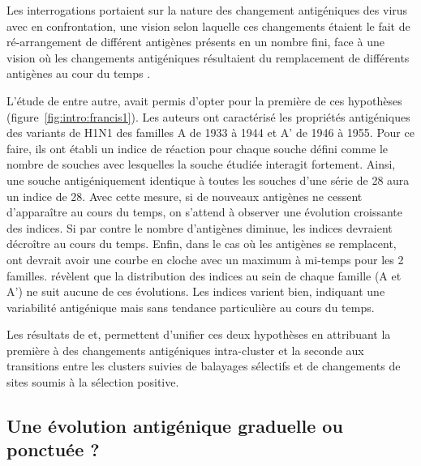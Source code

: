 Les interrogations portaient sur la nature des changement antigéniques
des virus avec en confrontation, une vision selon laquelle ces
changements étaient le fait de ré-arrangement de différent antigènes
présents en un nombre fini, face à une vision où les changements
antigéniques résultaient du remplacement de différents antigènes au
cour du temps \citep{Francis1960}.

L'étude de \citet{Jensen1957} entre autre, avait permis d'opter pour
la première de ces hypothèses (figure~\ref{fig:intro:francis1}).  Les
auteurs ont caractérisé les propriétés antigéniques des variants de
H1N1 des familles A de 1933 à 1944 et A' de 1946 à 1955.  Pour ce
faire, ils ont établi un indice de réaction pour chaque souche défini
comme le nombre de souches avec lesquelles la souche étudiée interagit
fortement. Ainsi, une souche antigéniquement identique à toutes les
souches d'une série de 28 aura un indice de 28. Avec cette mesure, si
de nouveaux antigènes ne cessent d'apparaître au cours du temps, on
s'attend à observer une évolution croissante des indices. Si par
contre le nombre d'antigènes diminue, les indices devraient décroître
au cours du temps. Enfin, dans le cas où les antigènes se remplacent,
ont devrait avoir une courbe en cloche avec un maximum à mi-temps pour
les 2 familles. \citet{Jensen1957} révèlent que la distribution des
indices au sein de chaque famille (A et A') ne suit aucune de ces
évolutions. Les indices varient bien, indiquant une variabilité
antigénique mais sans tendance particulière au cours du temps.

Les résultats de \citet{Koelle2006} et, \citet{Blackburne2008}
permettent d'unifier ces deux hypothèses en attribuant la première à
des changements antigéniques intra-cluster et la seconde aux
transitions entre les clusters suivies de balayages sélectifs et de
changements de sites soumis à la sélection positive.


\subsection{Une évolution antigénique graduelle ou ponctuée ?}
\label{sec:intro:debat}

